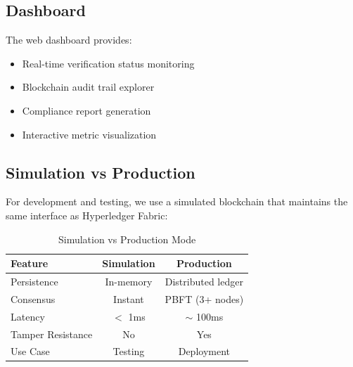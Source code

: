 \subsection{Dashboard}

The web dashboard provides:
\begin{itemize}
    \item Real-time verification status monitoring
    \item Blockchain audit trail explorer
    \item Compliance report generation
    \item Interactive metric visualization
\end{itemize}

\subsection{Simulation vs Production}

For development and testing, we use a simulated blockchain that maintains the same interface as Hyperledger Fabric:

\begin{table}[h]
\centering
\caption{Simulation vs Production Mode}
\begin{tabular}{lcc}
\toprule
\textbf{Feature} & \textbf{Simulation} & \textbf{Production} \\
\midrule
Persistence & In-memory & Distributed ledger \\
Consensus & Instant & PBFT (3+ nodes) \\
Latency & $<$ 1ms & $\sim$ 100ms \\
Tamper Resistance & No & Yes \\
Use Case & Testing & Deployment \\
\bottomrule
\end{tabular}
\end{table}
